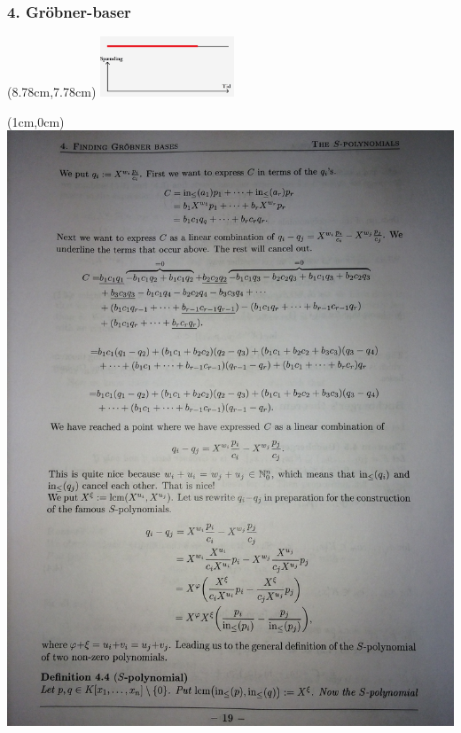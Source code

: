 \documentclass[10pt,notheorems,xcolor=pdftex,dvipsnames,table]{beamer}
\renewcommand{\{}{\left\lbrace}
\renewcommand{\}}{\right\rbrace}
\begin{document}
\begin{frame}[t]
\frametitle{
		\LARGE{4. Gröbner-baser}}
				\begin{textblock*}{0.1cm}(8.78cm,7.78cm)  
					\includegraphics[width=4cm]{disposition/d16.jpg}
				\end{textblock*}				
				\begin{textblock*}{0.85cm}(1cm,0cm)
					\includegraphics[scale=0.087]{2.jpg}
				\end{textblock*}				
\end{frame}
\end{document}

